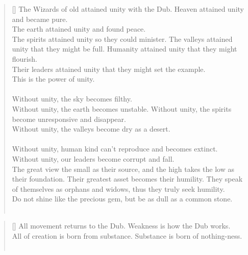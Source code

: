 \documentclass{article}
\begin{document}
\settowidth{\versewidth}{The Wizard leads byemptying people’s minds, filling their bellies, weakening their am- bitions, and making them become strong}
\begin{verse}[\versewidth]
The Wizards of old attained unity with the Dub. 
Heaven attained unity and became pure.\\
The earth attained unity and found peace.\\
The spirits attained unity so they could minister. 
The valleys attained unity that they might be full. 
Humanity attained unity that they might flourish.\\
Their leaders attained unity that they might set the example.\\
This is the power of unity.\\
\hfill\\
Without unity, the sky becomes filthy.\\
Without unity, the earth becomes unstable. 
Without unity, the spirits become unresponsive and disappear.\\
Without unity, the valleys become dry as a desert.\\
\hfill\\
Without unity, human kind can't reproduce and becomes extinct.\\
Without unity, our leaders become corrupt and fall.\\
The great view the small as their source, and the high takes the low as their foundation. 
Their greatest asset becomes their humility. 
They speak of themselves as orphans and widows, thus they truly seek humility.\\
Do not shine like the precious gem, but be as dull as a common stone.\\
\hfill\\
\end{verse}

\settowidth{\versewidth}{The Wizard leads byemptying people’s minds, filling their bellies, weakening their am- bitions, and making them become strong}
\begin{verse}[\versewidth]
All movement returns to the Dub. 
Weakness is how the Dub works.\\
All of creation is born from substance. 
Substance is born of nothing-ness.\\
\hfill\\
\end{verse}
\end{document}
